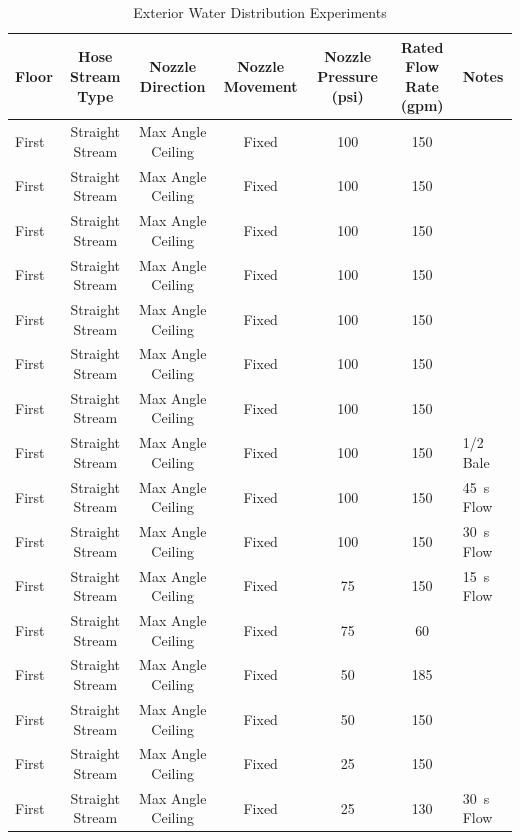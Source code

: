 \documentclass[12pt,oneside]{book}
\begin{document}
\clearpage

\begin{table}[!ht]
\centering
\scriptsize
\caption{Exterior Water Distribution Experiments}
\label{tab:Exterior_Fire_Attack_Distribution_Experiments}
\begin{tabular}{lcccccl}
\toprule[1.5pt]
Floor & Hose Stream Type & Nozzle Direction & Nozzle Movement & Nozzle Pressure (psi) & Rated Flow Rate (gpm) & Notes \\ 
\midrule

First  & Straight Stream  & Max Angle Ceiling      & Fixed              & 100 & 150 &   \\
First  & Straight Stream  & Max Angle Ceiling      & Fixed              & 100 & 150 &   \\
First  & Straight Stream  & Max Angle Ceiling      & Fixed              & 100 & 150 &   \\
First  & Straight Stream  & Max Angle Ceiling      & Fixed              & 100 & 150 &   \\
First  & Straight Stream  & Max Angle Ceiling      & Fixed              & 100 & 150 &   \\
First  & Straight Stream  & Max Angle Ceiling      & Fixed              & 100 & 150 &   \\
First  & Straight Stream  & Max Angle Ceiling      & Fixed              & 100 & 150 &   \\
First  & Straight Stream  & Max Angle Ceiling      & Fixed              & 100 & 150 & 1/2 Bale  \\
First  & Straight Stream  & Max Angle Ceiling      & Fixed              & 100 & 150 & 45~s Flow  \\
First  & Straight Stream  & Max Angle Ceiling      & Fixed              & 100 & 150 & 30~s Flow  \\
First  & Straight Stream  & Max Angle Ceiling      & Fixed              & 75  & 150 & 15~s Flow  \\
First  & Straight Stream  & Max Angle Ceiling      & Fixed              & 75  & 60 &   \\
First  & Straight Stream  & Max Angle Ceiling      & Fixed              & 50  & 185 &   \\
First  & Straight Stream  & Max Angle Ceiling      & Fixed              & 50  & 150 &   \\
First  & Straight Stream  & Max Angle Ceiling      & Fixed              & 25  & 150 &   \\
First  & Straight Stream  & Max Angle Ceiling      & Fixed              & 25  & 130 & 30~s Flow  \\

\end{tabular}
\end{table}
\end{document}
